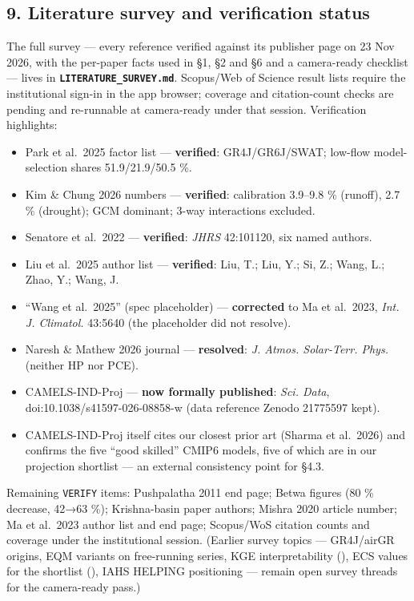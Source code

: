 \documentclass[
  english,
  11pt,
]{article}
\providecommand{\tightlist}{%
  \setlength{\itemsep}{0pt}\setlength{\parskip}{0pt}}
\begin{document}
\subsection{9. Literature survey and verification
status}\label{literature-survey-and-verification-status}

The full survey --- every reference verified against its publisher page
on 23 Nov 2026, with the per-paper facts used in §1, §2 and §6 and a
camera-ready checklist --- lives in
\textbf{\texttt{LITERATURE\_SURVEY.md}}. Scopus/Web of Science result
lists require the institutional sign-in in the app browser; coverage and
citation-count checks are pending and re-runnable at camera-ready under
that session. Verification highlights:

\begin{itemize}
\tightlist
\item
  Park et al.~2025 factor list --- \textbf{verified}: GR4J/GR6J/SWAT;
  low-flow model-selection shares 51.9/21.9/50.5 \%.
\item
  Kim \& Chung 2026 numbers --- \textbf{verified}: calibration 3.9--9.8
  \% (runoff), 2.7 \% (drought); GCM dominant; 3-way interactions
  excluded.
\item
  Senatore et al.~2022 --- \textbf{verified}: \emph{JHRS} 42:101120, six
  named authors.
\item
  Liu et al.~2025 author list --- \textbf{verified}: Liu, T.; Liu, Y.;
  Si, Z.; Wang, L.; Zhao, Y.; Wang, J.
\item
  ``Wang et al.~2025'' (spec placeholder) --- \textbf{corrected} to Ma
  et al.~2023, \emph{Int. J. Climatol.} 43:5640 (the placeholder did not
  resolve).
\item
  Naresh \& Mathew 2026 journal --- \textbf{resolved}: \emph{J. Atmos.
  Solar-Terr. Phys.} (neither HP nor PCE).
\item
  CAMELS-IND-Proj --- \textbf{now formally published}: \emph{Sci. Data},
  doi:10.1038/s41597-026-08858-w (data reference Zenodo 21775597 kept).
\item
  CAMELS-IND-Proj itself cites our closest prior art (Sharma et
  al.~2026) and confirms the five ``good skilled'' CMIP6 models, five of
  which are in our projection shortlist --- an external consistency
  point for §4.3.
\end{itemize}

Remaining \texttt{VERIFY} items: Pushpalatha 2011 end page; Betwa
figures (80 \% decrease, 42→63 \%); Krishna-basin paper authors; Mishra
2020 article number; Ma et al.~2023 author list and end page; Scopus/WoS
citation counts and coverage under the institutional session. (Earlier
survey topics --- GR4J/airGR origins, EQM variants on free-running
series, KGE interpretability (), ECS values for the shortlist
(), IAHS HELPING
positioning --- remain open survey threads for the camera-ready pass.)
\end{document}
